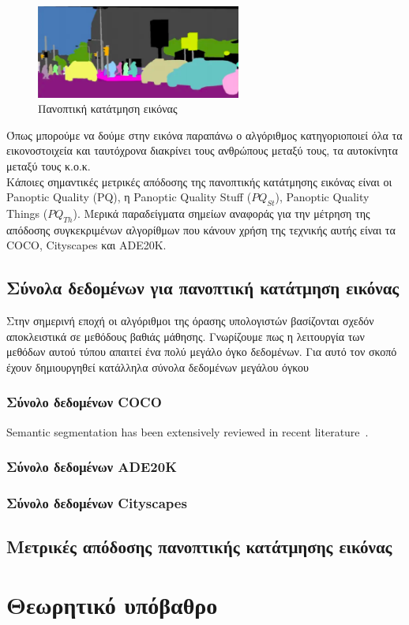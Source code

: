 \documentclass[12pt]{article}
\begin{document}
\newpage

\begin{figure}[h!]
  \centering
  \includegraphics[width=0.6\textwidth]{images/figure3.png} %
  \caption{Πανοπτική κατάτμηση εικόνας}
  \label{figure 3}
\end{figure}

Όπως μπορούμε να δούμε στην εικόνα παραπάνω ο αλγόριθμος κατηγοριοποιεί όλα τα εικονοστοιχεία και ταυτόχρονα διακρίνει τους ανθρώπους μεταξύ τους, τα αυτοκίνητα μεταξύ τους κ.ο.κ. \\

Κάποιες σημαντικές μετρικές απόδοσης της πανοπτικής κατάτμησης εικόνας είναι οι Panoptic Quality (PQ), η Panoptic Quality Stuff (\(PQ_{St}\)), Panoptic Quality Things (\(PQ_{Th}\)). Μερικά παραδείγματα σημείων αναφοράς για την μέτρηση της απόδοσης συγκεκριμένων αλγορίθμων που κάνουν χρήση της τεχνικής αυτής είναι τα COCO, Cityscapes και ADE20K.

\subsection{Σύνολα δεδομένων για πανοπτική κατάτμηση εικόνας}

Στην σημερινή εποχή οι αλγόριθμοι της όρασης υπολογιστών βασίζονται σχεδόν αποκλειστικά σε μεθόδους βαθιάς μάθησης. Γνωρίζουμε πως η λειτουργία των μεθόδων αυτού τύπου απαιτεί ένα πολύ μεγάλο όγκο δεδομένων. Για αυτό τον σκοπό έχουν δημιουργηθεί κατάλληλα σύνολα δεδομένων μεγάλου όγκου

\subsubsection{Σύνολο δεδομένων COCO}

Semantic segmentation has been extensively reviewed in recent literature~\cite{shelke2023cvreview}.


\subsubsection{Σύνολο δεδομένων ADE20K}

\subsubsection{Σύνολο δεδομένων Cityscapes}

\subsection{Μετρικές απόδοσης πανοπτικής κατάτμησης εικόνας}



\section{Θεωρητικό υπόβαθρο}

\newpage
\renewcommand{\refname}{Βιβλιογραφική αναφορά}

\end{document}
